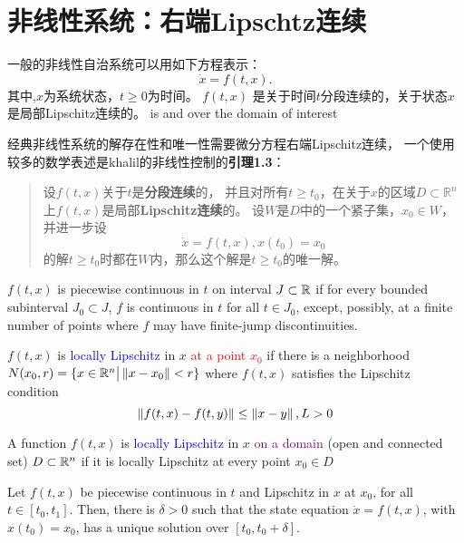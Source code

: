 \chapter{非线性系统：右端Lipschtz连续}

一般的非线性自治系统可以用如下方程表示：
\begin{equation}\label{eq:nonlinear}
    \dot{x}=f(t,x).
\end{equation}
其中,$x$为系统状态，$t\geq 0$为时间。
$f(t,x)$ 是关于时间$t$分段连续的，关于状态$x$是局部Lipschitz连续的。
is  and  over the domain of interest


经典非线性系统的解存在性和唯一性需要微分方程右端Lipschitz连续，
一个使用较多的数学表述是khalil的非线性控制的\textbf{引理1.3}：

\begin{quote}
设\(f(t,x)\)关于\(t\)是\textbf{分段连续}的，
并且对所有\(t\ge t_0\)，在关于\(x\)的区域\(D\subset \mathbb{R}^n\)上\(f(t,x)\)是局部\textbf{Lipschitz连续}的。
设\(W\)是\(D\)中的一个紧子集，\(x_0\in W\)，并进一步设 \[
\dot{x}=f(t,x),x(t_0)=x_0
\] 的解\(t\ge t_0\)时都在\(W\)内，那么这个解是\(t\ge t_0\)的唯一解。
\end{quote}

    $f(t,x)$ is piecewise continuous in $t$ on interval $J\subset \mathbb{R}$ 
    if for every bounded subinterval $J_0\subset J$, 
    $f$ is continuous in $t$ for all $t\in J_0$, 
    except, possibly, 
    at a finite number of points where $f$ may have finite-jump discontinuities.

    $f(t,x)$ is \textcolor{blue}{locally Lipschitz} in $x$ \textcolor{red}{at a point $x_0$} 
    if there is a neighborhood $N(x_0,r)=\{x\in \mathbb{R}^n \big| \left\lVert x-x_0\right\rVert<r\}$ 
    where $f(t,x)$ satisfies the Lipschitz condition
    \[\left\lVert f(t,x)-f(t,y)\right\rVert\le \left\lVert x-y\right\rVert,L>0\] 

    A function $f(t,x)$ is \textcolor{blue}{locally Lipschitz} in $x$ 
    \textcolor{purple}{on a domain} (open and connected set) $D\subset\mathbb{R}^n$ 
    if it is locally Lipschitz at every point $x_0\in D$

    \begin{lemma}
        Let $f(t,x)$ be piecewise continuous in $t$ and  Lipschitz 
        in $x$ at $x_0$,
        for all $t\in [t_0,t_1]$.
        Then, there is $\delta >0$ such that the state equation $\dot{x}=f(t,x)$,
         with $x(t_0)=x_0$,
        has a unique solution over $[t_0,t_0+\delta]$.
    \end{lemma}

